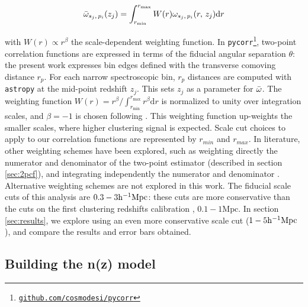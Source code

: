 \begin{equation}
    \bar{\omega}_{s_j, \,p_i}(z_j)=\int_{r_{\mathrm{min}}}^{r_{\mathrm{max}}}W(r)\omega_{s_j,\,p_i}(r,\,z_j)\mathrm{d}r
\end{equation}

with $W(r)\propto r^\beta$ the scale-dependent weighting function. In \texttt{pycorr}\footnote{\textcolor{blue}{\href{https://github.com/cosmodesi/pycorr}{\texttt{github.com/cosmodesi/pycorr}}}}, two-point correlation functions are expressed in terms of the fiducial angular separation $\theta$: the present work expresses bin edges defined with the transverse comoving distance $r_p$. For each narrow spectroscopic bin, $r_p$ distances are computed with \texttt{astropy} \cite{astropy2023paper3} at the mid-point redshift $z_j$. This sets $z_j$ as a parameter for $\bar{\omega}$. The weighting function $W(r)=r^\beta/\int_{r_{\mathrm{min}}}^{r_{\mathrm{max}}}r^\beta \mathrm{d}r$ is normalized to unity over integration scales, and $\beta=-1$ is chosen following \cite{ménard2014clusteringbasedredshiftestimationmethod, Schmidt2013ClusteringRedshifts}. This weighting function up-weights the smaller scales, where higher clustering signal is expected. Scale cut choices to apply to our correlation functions are represented by $r_{min}$ and $r_{max}$. In literature, other weighting schemes have been explored, such as weighting directly the numerator and denominator of the two-point estimator (described in section \ref{sec:2pcf}), and integrating independently the numerator and denominator \cite{KidsCrossCorrvdB2020,Gatti2018DESY1ClusteringRedshifts,Schmidt2013ClusteringRedshifts}. Alternative weighting schemes are not explored in this work. The fiducial scale cuts of this analysis are $0.3-3\mathrm{h}^{-1}\mathrm{Mpc}$: these cuts are more conservative than the cuts on the first clustering redshifts calibration \cite{HSCClusteringRau2023}, $0.1-1\mathrm{Mpc}$. In section \ref{sec:results}, we explore using an even more conservative scale cut ($1-5\mathrm{h}^{-1}\mathrm{Mpc}$), and compare the results and error bars obtained. 

\subsection{Building the n(z) model}\label{sec:modeling:nz}

